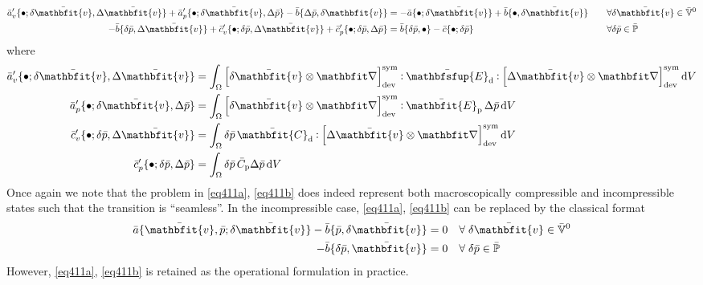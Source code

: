\documentclass[10pt,a4paper]{article}
\renewcommand{\ta}[1]{\mathbfit{#1}}
\renewcommand{\ts}[1]{\mathbfit{#1}}
\renewcommand{\tf}[1]{\mathbfsfup{#1}}
\newcommand{\ded}{\mathrm{d}}
\newcommand{\dep}{\mathrm{p}}
\begin{document}
\begin{align}
 \bar{a}'_v\{\bullet; \delta\bar{\ta v},\Delta\bar{\ta v}\} + \bar{a}'_p\{\bullet; \delta\bar{\ta v},\Delta\bar{p}\} - \bar{b}\{\Delta\bar p, \delta{\ta v}\}
	  &= -\bar{a}\{\bullet; \delta\bar{\ta v}\} + \bar{b}\{\bullet, \delta\bar{\ta v}\}
\quad &&\forall \delta\bar{\ta v}\in \bar{\set{V}}^0
 \label{eq414a}\\
- \bar{b}\{\delta\bar p, \Delta\bar{\ta v}\} + \bar{c}'_v\{\bullet; \delta\bar{p}, \Delta\bar{ \ta v}\} + \bar{c}'_p\{\bullet; \delta\bar{p},\Delta\bar{p}\}
	  &= \bar{b}\{\delta\bar{p},\bullet\} - \bar{c}\{\bullet;\delta\bar{p}\}
\quad &&\forall \delta\bar{p} \in \bar{\set{P}}
 \label{eq414b}
\end{align}
where
\begin{align}
 \bar{a}'_v\{\bullet; \delta\bar{\ta v},\Delta\bar{\ta v}\} &= \int_\Omega \left[\delta\bar{\ta v}\outerp\diff\right]^\sym_\dev \dprod \bar{\tf{E}}_\ded \dprod \left[\Delta\bar{\ta v}\outerp\diff\right]^\sym_\dev \dif V
 \label{eq415a}\\
 \bar{a}'_p\{\bullet; \delta\bar{\ta v},\Delta\bar{p}\}     &= \int_\Omega \left[\delta\bar{\ta v}\outerp\diff\right]^\sym_\dev \dprod \bar{\ts E}_\dep \,\Delta\bar{p} \dif V
 \label{eq415b}\\
 \bar{c}'_v\{\bullet; \delta\bar{p}, \Delta\bar{ \ta v}\}   &= \int_\Omega \delta\bar{p} \,\bar{\ts C}_\ded \dprod \left[\Delta\bar{\ta v}\outerp\diff\right]^\sym_\dev \dif V
 \label{eq415c}\\
 \bar{c}'_p\{\bullet; \delta\bar{p},\Delta\bar{p}\}         &= \int_\Omega \delta\bar{p} \,\bar{C}_\dep \Delta\bar p\dif V
 \label{eq415d}
\end{align}
Once again we note that the problem in \eqref{eq411a}, \eqref{eq411b} does indeed represent both macroscopically compressible and incompressible states such that the transition is ``seamless''.
In the incompressible case, \eqref{eq411a}, \eqref{eq411b} can be replaced by the classical format
\begin{align}
 \bar a\{\bar{\ta v},\bar p; \delta\bar{\ta v}\} - \bar b\{\bar p, \delta\bar{\ta v}\} &= 0   \quad \forall\; \delta\bar{\ta v} \in \bar{\set{V}}^0
 \label{eq420a}\\
 - \bar b\{\delta\bar p, \bar{\ta v}\} &= 0   \quad \forall\; \delta\bar p \in \bar{\set{P}}
 \label{eq420b}
\end{align}
However, \eqref{eq411a}, \eqref{eq411b} is retained as the operational formulation in practice.
\end{document}
